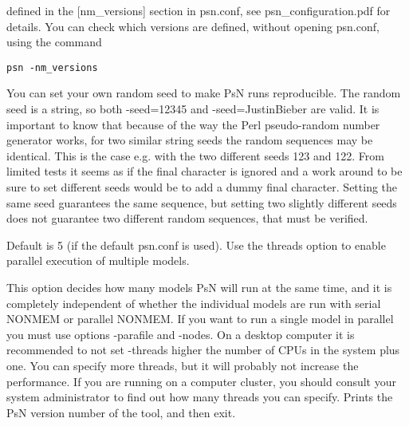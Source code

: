 \begin{optionlist}
defined in the [nm\_versions] section in psn.conf, see psn\_configuration.pdf for details. You can check which versions are defined, without opening psn.conf, using the command

\begin{verbatim}
psn -nm_versions
\end{verbatim}
\nextopt
{}
You can set your own random seed to make PsN runs reproducible. The random seed is a string, so both -seed=12345 and -seed=JustinBieber are valid. It is important to know that because of the way the Perl pseudo-random number generator works, for two similar string seeds the random sequences may be identical. This is the case e.g. with the two different seeds 123 and 122. From limited tests it seems as if the final character is ignored and a work around to be sure to set different seeds would be to add a dummy final character. 
Setting the same seed guarantees the same sequence, but setting two slightly different seeds does not guarantee two different random sequences, that must be verified.
\nextopt


Default is 5 (if the default psn.conf is used). Use the threads option to enable parallel execution of multiple models.

This option decides how many models PsN will run at the same time, and it is completely independent of whether the individual models are run with serial NONMEM or parallel NONMEM. If you want to run a single model in parallel you must use options -parafile and -nodes. On a desktop computer it is recommended to not set -threads higher the number of CPUs in the system plus one. 
You can specify more threads, but it will probably not increase the performance. If you are running on a computer cluster, you should consult your system administrator to find out how many threads you can specify. 
\nextopt
{}
Prints the PsN version number of the tool, and then exit. 
\nextopt
\end{optionlist}
